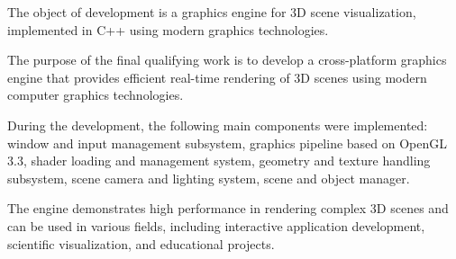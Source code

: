 The object of development is a graphics engine for 3D scene visualization, implemented in C++ using modern graphics technologies.

The purpose of the final qualifying work is to develop a cross-platform graphics engine that provides efficient real-time rendering of 3D scenes using modern computer graphics technologies.

During the development, the following main components were implemented: window and input management subsystem, graphics pipeline based on OpenGL 3.3, shader loading and management system, geometry and texture handling subsystem, scene camera and lighting system, scene and object manager.

The engine demonstrates high performance in rendering complex 3D scenes and can be used in various fields, including interactive application development, scientific visualization, and educational projects.
